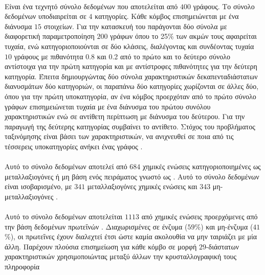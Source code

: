 \paragraph*{} Είναι ένα τεχνητό σύνολο δεδομένων που αποτελείται από $400$ γράφους.
Το σύνολο δεδομένων υποδιαιρείται σε $4$ κατηγορίες.
Κάθε κόμβος επισημειώνεται με ένα διάνυσμα $15$ στοιχείων.
Για την κατασκευή του παράγονται δύο σύνολα με διαφορετική παραμετροποίηση $200$ γράφων  όπου το 25\% των ακμών τους αφαιρείται τυχαία, ενώ κατηγοριοποιούνται σε δύο κλάσεις, διαλέγοντας και συνδέοντας τυχαία $10$ γράφους με πιθανότητα 0.8 και 0.2 από το πρώτο και το δεύτερο σύνολο αντίστοιχα για την πρώτη κατηγορία και με αντίστροφες πιθανότητες για την δεύτερη κατηγορία.
Έπειτα δημιουργώντας δύο σύνολα χαρακτηριστικών δεκαπενταδιάστατων διανυσμάτων δύο κατηγοριών, οι παραπάνω δύο κατηγορίες χωρίζονται σε άλλες δύο, όπου για την πρώτη υποκατηγορία, αν ένα κόμβος προερχόταν από το πρώτο σύνολο γράφων επισημειώνεται τυχαία με ένα διάνυσμα του πρώτου συνόλου χαρακτηριστικών ενώ σε αντίθετη περίπτωση με διάνυσμα του δεύτερου.
Για την παραγωγή της δεύτερης κατηγορίας συμβαίνει το αντίθετο.
Στόχος του προβλήματος ταξινόμησης είναι βάσει των χαρακτηριστικών, να ανιχνευθεί σε ποια από τις τέσσερεις υποκατηγορίες ανήκει ένας γράφος \cite{Morris16}.

\paragraph*{} Αυτό το σύνολο δεδομένων αποτελεί από $684$ χημικές ενώσεις κατηγοριοποιημένες ως μεταλλαξιογόνες ή μη βάση ενός πειράματος γνωστό ως .
Αυτό το σύνολο δεδομένων είναι ισοβαρισμένο, με $341$ μεταλλαξιογόνες χημικές ενώσεις και $343$ μη-μεταλλαξιογόνες \cite{mahe2009graph, Neumann2016}.

\paragraph*{} Αυτό το σύνολο δεδομένων αποτελείται $1113$ από χημικές ενώσεις προερχόμενες από την βάση δεδομένων πρωτεΐνών .
Διαχωρισμένες σε ένζυμα ($59$\%) και μη-ένζυμα ($41$\%), οι πρωτεΐνες έχουν διαλεχτεί έτσι ώστε καμία ακολουθία να μην ταιριάζει με μία άλλη.
Παρέχουν πλούσια επισημείωση για κάθε κόμβο σε μορφή $29$-διάστατων χαρακτηριστικών χρησιμοποιώντας μεταξύ άλλων την κρυσταλλογραφική τους πληροφορία \cite{DobsonDoig03, borgwardt2005protein, Neumann2016}

